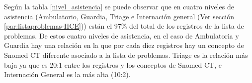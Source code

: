 
Según la tabla \ref{nivel_asistencia} se puede observar que en cuatro niveles de asistencia (Ambulatorio, Guardia, Triage e Internación general (Ver sección \ref{par:listaproblemas-HCE})) están el 97\% del total de los registros de la lista de problemas. De estos cuatro niveles de asistencia, en el caso de Ambulatoria y Guardia hay una relación en la que por cada diez registros hay un concepto de Snomed CT diferente asociado a la lista de problemas. Triage es la relación más baja ya que es 20:1 entre los registros y los conceptos de Snomed  CT, e Internación General es la más alta (10:2).

